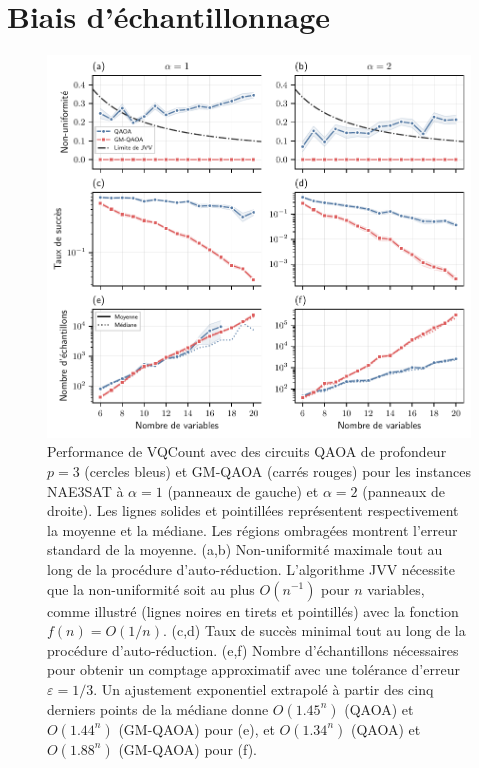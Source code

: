 
\section{Biais d'échantillonnage}
\label{sec:biais-echantillonnage}

\begin{figure}[ht!]
    \centering
    \includegraphics[width=1\textwidth]{figures/nae3sat-nonuniformity.pdf}
    \caption[Biais d'échantillonnage pour \#NAE3SAT]{Performance de VQCount avec des circuits QAOA de profondeur $p=3$ (cercles bleus) et GM-QAOA (carrés rouges) pour les instances NAE3SAT à $\alpha=1$ (panneaux de gauche) et $\alpha=2$ (panneaux de droite). Les lignes solides et pointillées représentent respectivement la moyenne et la médiane. Les régions ombragées montrent l'erreur standard de la moyenne. (a,b) Non-uniformité maximale tout au long de la procédure d'auto-réduction. L'algorithme JVV nécessite que la non-uniformité soit au plus $O(n^{-1})$ pour $n$ variables, comme illustré (lignes noires en tirets et pointillés) avec la fonction $f(n) = O(1/n)$. (c,d) Taux de succès minimal tout au long de la procédure d'auto-réduction. (e,f) Nombre d'échantillons nécessaires pour obtenir un comptage approximatif avec une tolérance d'erreur $\varepsilon = 1/3$. Un ajustement exponentiel extrapolé à partir des cinq derniers points de la médiane donne $O(1.45^n)$ (QAOA) et $O(1.44^n)$ (GM-QAOA) pour (e), et $O(1.34^n)$ (QAOA) et $O(1.88^n)$ (GM-QAOA) pour (f).}
    \label{fig:nae3sat-number-of-samples}
\end{figure}

